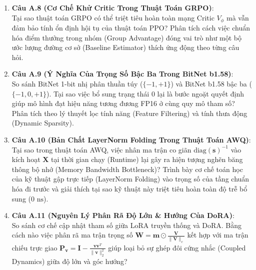 \begin{enumerate}
  \item \textbf{Câu A.8 (Cơ Chế Khử Critic Trong Thuật Toán GRPO)}: \\
  Tại sao thuật toán GRPO có thể triệt tiêu hoàn toàn mạng Critic $V_\phi$ mà vẫn đảm bảo tính ổn định hội tụ của thuật toán PPO? Phân tích cách việc chuẩn hóa điểm thưởng trong nhóm (Group Advantage) đóng vai trò như một bộ ước lượng đường cơ sở (Baseline Estimator) thích ứng động theo từng câu hỏi.

  \item \textbf{Câu A.9 (Ý Nghĩa Của Trọng Số Bậc Ba Trong BitNet b1.58)}: \\
  So sánh BitNet 1-bit nhị phân thuần túy ($\{-1, +1\}$) và BitNet b1.58 bậc ba ($\{-1, 0, +1\}$). Tại sao việc bổ sung trạng thái $0$ lại là bước ngoặt quyết định giúp mô hình đạt hiệu năng tương đương FP16 ở cùng quy mô tham số? Phân tích theo lý thuyết lọc tính năng (Feature Filtering) và tính thưa động (Dynamic Sparsity).

  \item \textbf{Câu A.10 (Bản Chất LayerNorm Folding Trong Thuật Toán AWQ)}: \\
  Tại sao trong thuật toán AWQ, việc nhân ma trận co giãn $\text{diag}(\mathbf{s})^{-1}$ vào kích hoạt $\mathbf{X}$ tại thời gian chạy (Runtime) lại gây ra hiện tượng nghẽn băng thông bộ nhớ (Memory Bandwidth Bottleneck)? Trình bày cơ chế toán học của kỹ thuật gập trực tiếp (LayerNorm Folding) vào trọng số của tầng chuẩn hóa đi trước và giải thích tại sao kỹ thuật này triệt tiêu hoàn toàn độ trễ bổ sung ($0\text{ ns}$).

  \item \textbf{Câu A.11 (Nguyên Lý Phân Rã Độ Lớn \& Hướng Của DoRA)}: \\
  So sánh cơ chế cập nhật tham số giữa LoRA truyền thống và DoRA. Bằng cách nào việc phân rã ma trận trọng số $\mathbf{W} = \mathbf{m} \odot \frac{\mathbf{V}}{\|\mathbf{V}\|_c}$ kết hợp với ma trận chiếu trực giao $\mathbf{P}_{\mathbf{v}} = \mathbf{I} - \frac{\mathbf{v}\mathbf{v}^T}{\|\mathbf{v}\|_2^2}$ giúp loại bỏ sự ghép đôi cứng nhắc (Coupled Dynamics) giữa độ lớn và góc hướng?
\end{enumerate}

